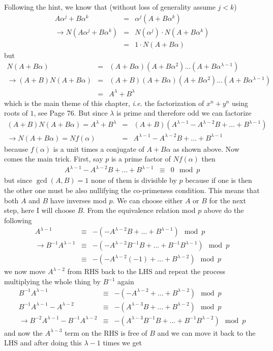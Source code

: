 \documentclass[aps,preprint,preprintnumbers,nofootinbib,showpacs,prd]{revtex4-1}
\newcommand{\ie}{{\it i.e.} }
\newcommand{\nbea}{\begin{eqnarray*}}
\newcommand{\neea}{\end{eqnarray*}}
\begin{document}
Following the hint, we know that (without loss of generality assume $j < k$)
%
\nbea
A\alpha^j + B\alpha^k & = & \alpha^j(A + B\alpha^k) \\
\to N(A\alpha^j + B\alpha^k) & = & N(\alpha^j) \cdot N(A + B\alpha^k) \\
& = & 1 \cdot N(A + B\alpha)
\neea
%
but 
%
\nbea
N(A + B\alpha) & = & (A + B\alpha) (A + B\alpha^2) \dots (A + B\alpha^{\lambda-1}) \\
\to (A + B)N(A + B\alpha) & = & (A + B)(A + B\alpha) (A + B\alpha^2) \dots (A + B\alpha^{\lambda-1}) \\
& = & A^\lambda + B^\lambda
\neea
%
which is the main theme of this chapter, \ie the factorization of $x^n + y^n$ using roots of $1$, see Page 76. But since $\lambda$ is prime and therefore odd we can factorize
%
\nbea
(A + B)N(A + B\alpha) = A^\lambda + B^\lambda & = & (A + B)(A^{\lambda-1} - A^{\lambda-2}B + \dots + B^{\lambda - 1}) \\
\to N(A + B\alpha) = Nf(\alpha) & = & A^{\lambda-1} - A^{\lambda-2}B + \dots + B^{\lambda - 1}
\neea
%
because $f(\alpha)$ is a unit times a conjugate of $A + B\alpha$ as shown above. Now comes the main trick. First, say $p$ is a prime factor of $Nf(\alpha)$ then 
%
\nbea
A^{\lambda-1} - A^{\lambda-2}B + \dots + B^{\lambda - 1} & \equiv & 0 \mod{p}
\neea
%
but since $\gcd(A,B) = 1$ none of them is divisible by $p$ because if one is then the other one must be also nullifying the co-primeness condition. This means that both $A$ and $B$ have inverses mod $p$. We can choose either $A$ or $B$ for the next step, here I will choose $B$. From the equivalence relation mod $p$ above do the following
%
\nbea
A^{\lambda-1}  & \equiv & -(- A^{\lambda-2}B + \dots + B^{\lambda - 1}) \mod{p} \\
\to B^{-1}A^{\lambda-1}  & \equiv & -(- A^{\lambda-2}B^{-1}B + \dots + B^{-1}B^{\lambda - 1}) \mod{p} \\
& \equiv & -(- A^{\lambda-2}(-1) + \dots + B^{\lambda - 2}) \mod{p}
\neea
%
we now move $A^{\lambda-2}$ from RHS back to the LHS and repeat the process multiplying the whole thing by $B^{-1}$ again
%
\nbea
B^{-1}A^{\lambda-1} & \equiv & -(- A^{\lambda-2} + \dots + B^{\lambda - 2}) \mod{p} \\
B^{-1}A^{\lambda-1} - A^{\lambda - 2} & \equiv & -(A^{\lambda-3}B + \dots + B^{\lambda - 2}) \mod{p} \\
\to B^{-2}A^{\lambda-1} - B^{-1}A^{\lambda - 2} & \equiv & -(A^{\lambda-3}B^{-1}B + \dots + B^{-1}B^{\lambda - 2}) \mod{p}
\neea
%
and now the $A^{\lambda-3}$ term on the RHS is free of $B$ and we can move it back to the LHS and after doing this $\lambda - 1$ times we get
\end{document}
